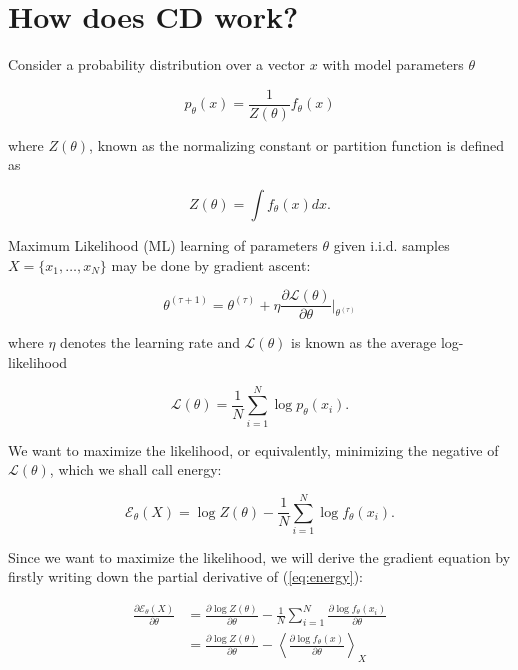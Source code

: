 \documentclass[11pt]{article}
\begin{document}
\section{How does CD work?}

Consider a probability distribution over a vector $x$ with model parameters $\theta$

\begin{equation}
p_\theta(x) = \frac{1}{Z(\theta)} f_\theta(x)
\end{equation}

where $Z(\theta)$, known as the normalizing constant or partition function is defined as

\begin{equation}
Z(\theta) = \int f_\theta(x) dx.
\end{equation}

Maximum Likelihood (ML) learning of parameters $\theta$ given i.i.d. samples $X=\{x_1,\ldots,x_N\}$ may be done by gradient ascent:

\begin{equation}
\theta^{(\tau+1)} = \theta^{(\tau)} + \eta \frac{\partial\mathcal{L}(\theta)}{\partial \theta} \bigg\vert_{\theta^{(\tau)}}
\end{equation}

where $\eta$ denotes the learning rate and $\mathcal{L}(\theta)$ is known as the average log-likelihood

\begin{equation}
\mathcal{L}(\theta) = \frac{1}{N} \sum_{i=1}^{N} \log p_\theta(x_i).
\end{equation} 

We want to maximize the likelihood, or equivalently, minimizing the negative of $\mathcal{L}(\theta)$, which we shall call energy:

\begin{equation}
\mathcal{E}_\theta(X) = \log Z(\theta) - \frac{1}{N} \sum_{i=1}^N \log f_\theta(x_i).
\label{eq:energy}
\end{equation}

Since we want to maximize the likelihood, we will derive the gradient equation by firstly writing down the partial derivative of (\ref{eq:energy}):

\begin{align}
\frac{\partial\mathcal{E}_\theta(X)}{\partial\theta}
&= \frac{\partial\log Z(\theta)}{\partial\theta} - \frac{1}{N}\sum_{i=1}^N\frac{\partial\log f_\theta(x_i)}{\partial\theta}\\
&= \frac{\partial\log Z (\theta)}{\partial\theta} - \left\langle\frac{\partial\log f_\theta (x)}{\partial\theta}\right\rangle_X 
\label{eq:gradient}
\end{align}
\end{document}
